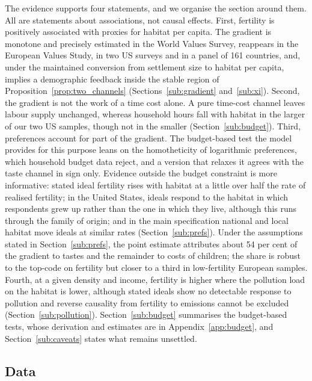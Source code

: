 \documentclass[11pt]{article}
\begin{document}
The evidence supports four statements, and we organise the section around
them. All are statements about associations, not causal effects. First, fertility is positively
associated with proxies for habitat per capita. The gradient is monotone and precisely estimated in the
World Values Survey, reappears in the European Values Study, in two US surveys and in a panel of 161
countries, and, under the maintained conversion from settlement size to habitat per capita, implies a
demographic feedback inside the stable region of Proposition~\ref{prop:two_channels} (Sections~\ref{sub:gradient} and~\ref{sub:xi}). Second, the
gradient is not the work of a time cost alone. A pure time-cost channel leaves labour supply
unchanged, whereas household hours fall with habitat in the larger of our two US samples, though
not in the smaller (Section~\ref{sub:budget}). Third, preferences account for part of the gradient. The budget-based
test the model provides for this purpose leans on the homotheticity of logarithmic preferences,
which household budget data reject, and a version that relaxes it agrees with the taste channel in
sign only. Evidence outside the budget constraint is more informative: stated ideal fertility
rises with habitat at a little over half the rate of realised fertility; in the United States,
ideals respond to the habitat in which respondents grew up rather than the one in which they live,
although this runs through the family of origin; and in the main specification national and local
habitat move ideals at similar rates (Section~\ref{sub:prefs}). Under the assumptions stated in Section~\ref{sub:prefs}, the point estimate attributes about
54 per cent of the gradient to tastes and the remainder to costs of children; the share is robust to
the top-code on fertility but closer to a third in low-fertility European samples. Fourth, at a given density and income, fertility is higher where the pollution load on the habitat is lower, although stated ideals show no detectable response to pollution and reverse causality from fertility
to emissions cannot be excluded (Section~\ref{sub:pollution}). Section~\ref{sub:budget} summarises the
budget-based tests, whose derivation and estimates are in Appendix~\ref{app:budget}, and
Section~\ref{sub:caveats} states what remains unsettled.

\subsection{Data}
\label{sub:data}
\end{document}

